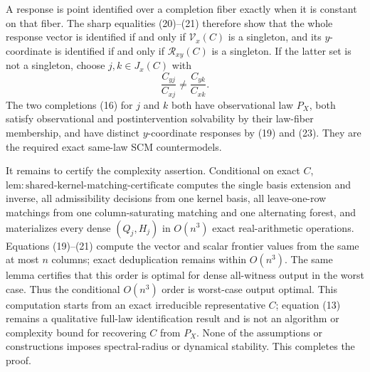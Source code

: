 A response is point identified over a completion fiber exactly when it is constant on that fiber. The sharp equalities (20)--(21) therefore show that the whole response vector is identified if and only if \(\mathcal V_x(C)\) is a singleton, and its \(y\)-coordinate is identified if and only if \(\mathcal R_{xy}(C)\) is a singleton. If the latter set is not a singleton, choose \(j,k\in J_x(C)\) with
\[
 \frac{C_{yj}}{C_{xj}}\ne\frac{C_{yk}}{C_{xk}}. \tag{23}
\]
The two completions (16) for \(j\) and \(k\) both have observational law \(P_X\), both satisfy observational and postintervention solvability by their law-fiber membership, and have distinct \(y\)-coordinate responses by (19) and (23). They are the required exact same-law SCM countermodels.

It remains to certify the complexity assertion. Conditional on exact \(C\), \(\mathrm{lem{:}shared\text{-}kernel\text{-}matching\text{-}certificate}\) computes the single basis extension and inverse, all admissibility decisions from one kernel basis, all leave-one-row matchings from one column-saturating matching and one alternating forest, and materializes every dense \((Q_j,H_j)\) in \(O(n^3)\) exact real-arithmetic operations. Equations (19)--(21) compute the vector and scalar frontier values from the same at most \(n\) columns; exact deduplication remains within \(O(n^3)\). The same lemma certifies that this order is optimal for dense all-witness output in the worst case. Thus the conditional \(O(n^3)\) order is worst-case output optimal. This computation starts from an exact irreducible representative \(C\); equation (13) remains a qualitative full-law identification result and is not an algorithm or complexity bound for recovering \(C\) from \(P_X\). None of the assumptions or constructions imposes spectral-radius or dynamical stability. This completes the proof.